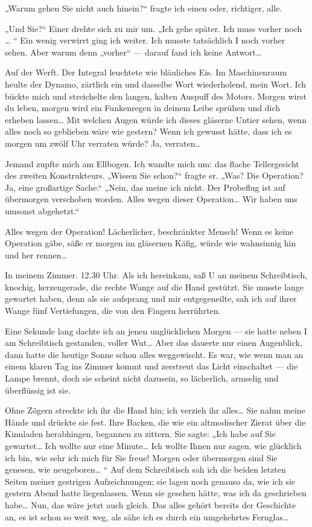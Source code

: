 „Warum gehen Sie nicht auch hinein?“ fragte ich einen oder,
richtiger, alle.

„Und Sie?“ Einer drehte sich zu mir um. „Ich gehe später. Ich muss
vorher noch \ldots{} “ Ein wenig verwirrt ging ich weiter. Ich musste
tatsächlich I noch vorher sehen. Aber warum denn „vorher“ — darauf
fand ich keine Antwort\ldots{}

Auf der Werft. Der Integral leuchtete wie bläuliches Eis. Im
Maschinenraum heulte der Dynamo, zärtlich ein und dasselbe Wort
wiederholend, mein Wort. Ich bückte mich und streichelte den
langen, kalten Auspuff des Motors. Morgen wirst du leben, morgen
wird ein Funkenregen in deinem Leibe sprühen und dich erheben
lassen\ldots{} Mit welchen Augen würde ich dieses gläserne Untier sehen,
wenn alles noch so geblieben wäre wie gestern? Wenn ich gewusst
hätte, dass ich es morgen um zwölf Uhr verraten würde? Ja,
verraten\ldots{}

Jemand zupfte mich am Ellbogen. Ich wandte mich um: das flache
Tellergesicht des zweiten Konstrukteurs. „Wissen Sie schon?“ fragte
er. „Was? Die Operation? Ja, eine großartige Sache.“ „Nein, das
meine ich nicht. Der Probeflug ist auf übermorgen verschoben
worden. Alles wegen dieser Operation\ldots{} Wir haben uns umsonst
abgehetzt.“

Alles wegen der Operation! Lächerlicher, beschränkter Mensch! Wenn
es keine Operation gäbe, säße er morgen im gläsernen Käfig, würde
wie wahnsinnig hin und her rennen\ldots{}

In meinem Zimmer. 12.30 Uhr. Als ich hereinkam, saß U an meinem
Schreibtisch, knochig, kerzengerade, die rechte Wange auf die Hand
gestützt. Sie musste lange gewartet haben, denn als sie aufsprang
und mir entgegeneilte, sah ich auf ihrer Wange fünf Vertiefungen,
die von den Fingern herrührten.

Eine Sekunde lang dachte ich an jenen unglücklichen Morgen — sie
hatte neben I am Schreibtisch gestanden, voller Wut\ldots{} Aber das
dauerte nur einen Augenblick, dann hatte die heutige Sonne schon
alles weggewischt. Es war, wie wenn man an einem klaren Tag ins
Zimmer kommt und zerstreut das Licht einschaltet — die Lampe
brennt, doch sie scheint nicht dazusein, so lächerlich, armselig
und überflüssig ist sie.

Ohne Zögern streckte ich ihr die Hand hin; ich verzieh ihr alles\ldots{}
Sie nahm meine Hände und drückte sie fest. Ihre Backen, die wie ein
altmodischer Zierat über die Kinnladen herabhingen, begannen zu
zittern. Sie sagte: „Ich habe auf Sie gewartet\ldots{} Ich wollte nur
eine Minute\ldots{} Ich wollte Ihnen nur sagen, wie glücklich ich bin,
wie sehr ich mich für Sie freue! Morgen oder übermorgen sind Sie
genesen, wie neugeboren\ldots{} “ Auf dem Schreibtisch sah ich die
beiden letzten Seiten meiner gestrigen Aufzeichnungen; sie lagen
noch genauso da, wie ich sie gestern Abend hatte liegenlassen. Wenn
sie gesehen hätte, was ich da geschrieben habe\ldots{} Nun, das wäre
jetzt auch gleich. Das alles gehört bereits der Geschichte an, es
ist schon so weit weg, als sähe ich es durch ein umgekehrtes
Fernglas\ldots{}

